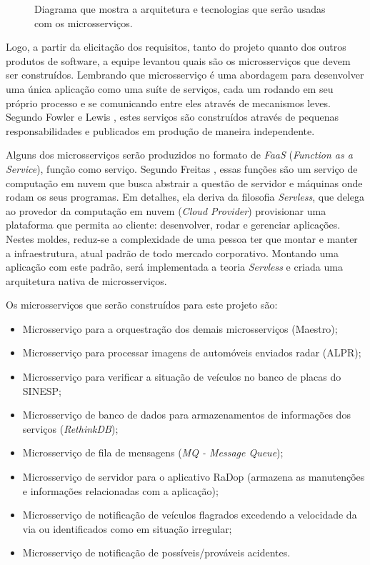 \begin{figure}[H]
	\caption{\label{fig:diagrama-arq-microsservicos} Diagrama que mostra a arquitetura e tecnologias que serão usadas com os microsserviços.}
\end{figure}

Logo, a partir da elicitação dos requisitos, tanto do projeto quanto dos outros produtos de software, a equipe levantou quais são os microsserviços que devem ser construídos. Lembrando que microsserviço é uma abordagem para desenvolver uma única aplicação como uma suíte de serviços, cada um rodando em seu próprio processo e se comunicando entre eles através de mecanismos leves. Segundo Fowler e Lewis \cite{fowler2015}, estes serviços são construídos através de pequenas responsabilidades e publicados em produção de maneira independente.

Alguns dos microsserviços serão produzidos no formato de \textit{FaaS} (\textit{Function as a Service}), função como serviço. Segundo Freitas \cite{freitas2018}, essas funções são um serviço de computação em nuvem que busca abstrair a questão de servidor e máquinas onde rodam os seus programas. Em detalhes, ela deriva da filosofia \textit{Servless}, que delega ao provedor da computação em nuvem (\textit{Cloud Provider}) provisionar uma plataforma que permita ao cliente: desenvolver, rodar e gerenciar aplicações. Nestes moldes, reduz-se a complexidade de uma pessoa ter que montar e manter a infraestrutura, atual padrão de todo mercado corporativo. Montando uma aplicação com este padrão, será implementada a teoria \textit{Servless} e criada uma arquitetura nativa de microsserviços.

Os microsserviços que serão construídos para este projeto são:

\begin{itemize}
    \item Microsserviço para a orquestração dos demais microsserviços (Maestro);
    \item Microsserviço para processar imagens de automóveis enviados radar (ALPR);
    \item Microsserviço para verificar a situação de veículos no banco de placas do SINESP;
    \item Microsserviço de banco de dados para armazenamentos de informações dos serviços (\textit{RethinkDB});
    \item Microsserviço de fila de mensagens (\textit{MQ - Message Queue});
    \item Microsserviço de servidor para o aplicativo RaDop (armazena as manutenções e informações relacionadas com a aplicação);
    \item Microsserviço de notificação de veículos flagrados excedendo a velocidade da via ou identificados como em situação irregular;
    \item Microsserviço de notificação de possíveis/prováveis acidentes.
\end{itemize}


